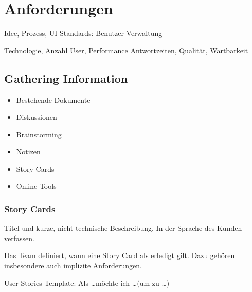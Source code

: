 \section{Anforderungen}

Idee, Prozess, UI
Standards: Benutzer-Verwaltung

Technologie, Anzahl User, Performance
Antwortzeiten, Qualität, Wartbarkeit

\subsection{Gathering Information}
\begin{itemize}
  \item Bestehende Dokumente
  \item Diskussionen
  \item Brainstorming
  \item Notizen
  \item Story Cards
  \item Online-Tools
\end{itemize}

\subsubsection{Story Cards}
Titel und kurze, nicht-technische Beschreibung. In der Sprache des Kunden verfassen.

Das Team definiert, wann eine Story Card als erledigt gilt. Dazu gehören insbesondere auch implizite Anforderungen.

User Stories Template: Als \dots möchte ich \dots (um zu \dots)